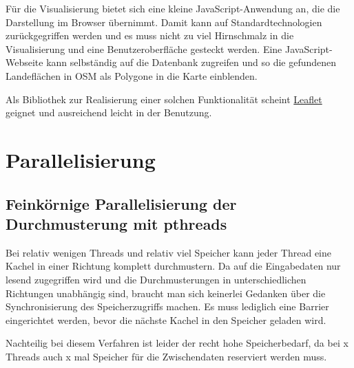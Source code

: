 \documentclass[
11pt, %
a4paper, %
oneside, %
pdfspacing, %
headinclude,
BCOR5mm, %
ngerman, %
bibtotocnumbered,
]{scrartcl}
\begin{document}
Für die Visualisierung bietet sich eine kleine JavaScript-Anwendung an, die die Darstellung im Browser übernimmt. Damit kann auf Standardtechnologien zurückgegriffen werden und es muss nicht zu viel Hirnschmalz in die Visualisierung und eine Benutzeroberfläche gesteckt werden. 
Eine JavaScript-Webseite kann selbständig auf die Datenbank zugreifen und so die gefundenen Landeflächen in OSM als Polygone in die Karte einblenden. 

Als Bibliothek zur Realisierung einer solchen Funktionalität scheint \href{http://leafletjs.com/examples.html }{Leaflet} geignet und ausreichend leicht in der Benutzung.





\section{Parallelisierung}

\subsection{Feinkörnige Parallelisierung der Durchmusterung mit pthreads}

Bei relativ wenigen Threads und relativ viel Speicher kann jeder Thread eine Kachel in einer Richtung komplett durchmustern. Da auf die Eingabedaten nur lesend zugegriffen wird und die Durchmusterungen in unterschiedlichen Richtungen unabhängig sind, braucht man sich keinerlei Gedanken über die Synchronisierung des Speicherzugriffs machen. Es muss lediglich eine Barrier eingerichtet werden, bevor die nächste Kachel in den Speicher geladen wird.

Nachteilig bei diesem Verfahren ist leider der recht hohe Speicherbedarf, da bei x Threads auch x mal Speicher für die Zwischendaten reserviert werden muss.

\skippingparagraph
\end{document}
